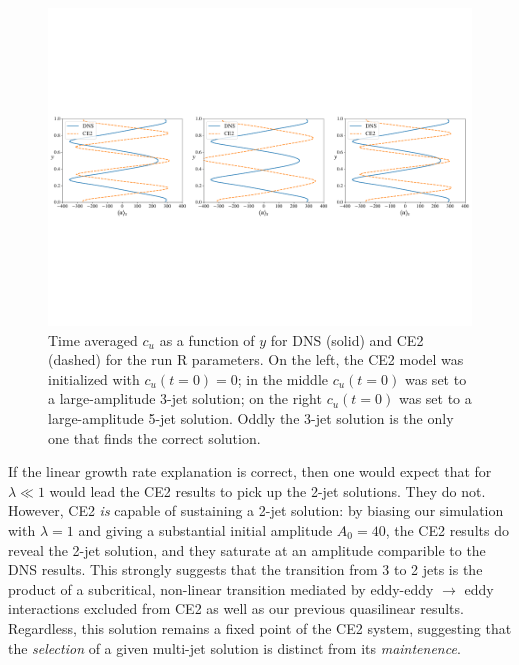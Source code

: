 \documentclass{jfm}
\begin{document}
\begin{figure}
  \centering
  \includegraphics[width=\textwidth]{../../figs/umean_dns_ce2_runRST.pdf}
  \caption{Time averaged $c_u$ as a function of $y$ for DNS (solid) and CE2 (dashed) for the run R parameters. On the left, the CE2 model was initialized with $c_u(t=0) = 0$; in the middle $c_u(t=0)$ was set to a large-amplitude 3-jet solution; on the right $c_u(t=0)$ was set to a large-amplitude 5-jet solution. Oddly the 3-jet solution is the only one that finds the correct solution.}
  \label{fig:cu_vs_y_runA}
\end{figure}

If the linear growth rate explanation is correct, then one would expect that for $\lambda \ll 1$ would lead the CE2 results to pick up the 2-jet solutions.
They do not.
However, CE2 \emph{is} capable of sustaining a 2-jet solution:
by biasing our simulation with $\lambda = 1$ and giving a substantial initial amplitude $A_0 = 40$, the CE2 results do reveal the 2-jet solution, and they saturate at an amplitude comparible to the DNS results.
This strongly suggests that the transition from 3 to 2 jets is the product of a subcritical, non-linear transition mediated by eddy-eddy $\to$ eddy interactions excluded from CE2 as well as our previous quasilinear results.
Regardless, this solution remains a fixed point of the CE2 system, suggesting that the \emph{selection} of a given multi-jet solution is distinct from its \emph{maintenence}.



\end{document}
